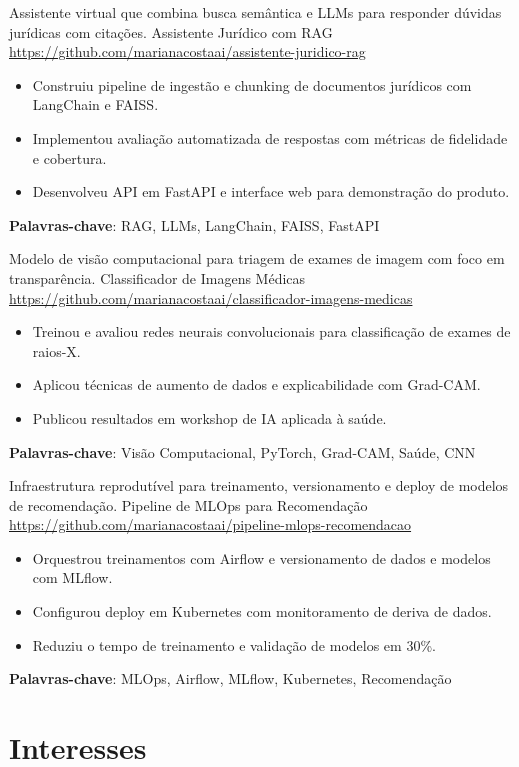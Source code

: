 \documentclass[a4paper, serif, 10pt]{moderncv}
\begin{document}
        {Assistente virtual que combina busca semântica e LLMs para responder dúvidas jurídicas com citações.}
        {Assistente Jurídico com RAG}
        {\url{https://github.com/marianacostaai/assistente-juridico-rag}}
        {}
        {\begin{itemize}
\item Construiu pipeline de ingestão e chunking de documentos jurídicos com LangChain e FAISS.
\item Implementou avaliação automatizada de respostas com métricas de fidelidade e cobertura.
\item Desenvolveu API em FastAPI e interface web para demonstração do produto.
\end{itemize}
\textbf{Palavras-chave}: RAG, LLMs, LangChain, FAISS, FastAPI}

        {Modelo de visão computacional para triagem de exames de imagem com foco em transparência.}
        {Classificador de Imagens Médicas}
        {\url{https://github.com/marianacostaai/classificador-imagens-medicas}}
        {}
        {\begin{itemize}
\item Treinou e avaliou redes neurais convolucionais para classificação de exames de raios-X.
\item Aplicou técnicas de aumento de dados e explicabilidade com Grad-CAM.
\item Publicou resultados em workshop de IA aplicada à saúde.
\end{itemize}
\textbf{Palavras-chave}: Visão Computacional, PyTorch, Grad-CAM, Saúde, CNN}

        {Infraestrutura reprodutível para treinamento, versionamento e deploy de modelos de recomendação.}
        {Pipeline de MLOps para Recomendação}
        {\url{https://github.com/marianacostaai/pipeline-mlops-recomendacao}}
        {}
        {\begin{itemize}
\item Orquestrou treinamentos com Airflow e versionamento de dados e modelos com MLflow.
\item Configurou deploy em Kubernetes com monitoramento de deriva de dados.
\item Reduziu o tempo de treinamento e validação de modelos em 30\%.
\end{itemize}
\textbf{Palavras-chave}: MLOps, Airflow, MLflow, Kubernetes, Recomendação}
\section{Interesses}
\end{document}
